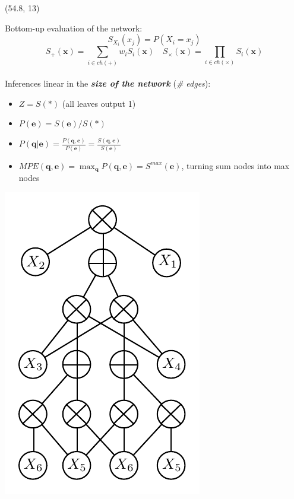 \documentclass[final]{beamer}
\begin{document}
\begin{frame}{}
  \begin{textblock}{25.2}(54.8, 13)
    \footnotesize
    \begin{minipage}{0.7\linewidth}
      
    Bottom-up evaluation of the network:
    $$S_{X_i}(x_j)=P(X_i=x_j)$$    
    $$S_{+}(\mathbf{x})=\sum\limits_{i\in
      ch(+)}w_{i}S_{i}(\mathbf{x})\quad S_{\times}(\mathbf{x})=\prod\limits_{i\in
      ch(\times)}S_{i}(\mathbf{x})$$\\[10pt]
    \setlength{\leftmargini}{30pt}
    Inferences linear in the \emph{\textbf{size of the network}} (\emph{\# edges}):
    \begin{itemize}
    \item $Z = S(*)$ (all leaves output 1)
    \item $P(\mathbf{e}) = S(\mathbf{e})/S(*)$
    \item $P(\mathbf{q}| \mathbf{e}) = \frac{P(\mathbf{q},
        \mathbf{e})}{P(\mathbf{e})} = \frac{S(\mathbf{q},
        \mathbf{e})}{S(\mathbf{e})}$
    \item $MPE(\mathbf{q},\mathbf{e}) = \max_{\mathbf{q}}P(\mathbf{q},
      \mathbf{e}) = S^{max}(\mathbf{e})$, turning sum nodes into max nodes
    \end{itemize}
  \end{minipage}\begin{minipage}{0.28\linewidth}
    \includegraphics[width=0.8\linewidth]{figures/spn-long}
  \end{minipage}\\[20pt]


\end{textblock}
\end{frame}
\end{document}
